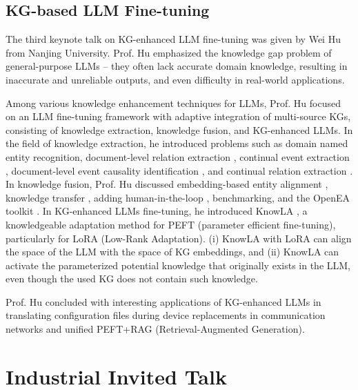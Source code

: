 \documentclass{sig-alternate-10pt}
\begin{document}
\vspace{-1mm}
\subsection{KG-based LLM Fine-tuning} 
\label{sec:keynote3}

\medskip
\medskip

The third keynote talk on KG-enhanced LLM
fine-tuning was given by Wei Hu from
Nanjing University. Prof. Hu emphasized the knowledge gap problem of general-purpose LLMs -- they often lack accurate domain knowledge, resulting in
inaccurate and unreliable outputs, and even difficulty in real-world applications.

Among various knowledge enhancement techniques for LLMs, Prof. Hu focused on an LLM fine-tuning framework with adaptive integration of multi-source KGs, consisting of knowledge extraction, knowledge fusion, and KG-enhanced LLMs. In the field of knowledge extraction, he introduced problems such as domain named
entity recognition, document-level relation extraction \cite{WangWSH22}, continual event extraction \cite{WangW023}, document-level event causality identification \cite{LJZGH23}, and continual relation extraction \cite{WangWH23}. In knowledge fusion, Prof. Hu discussed embedding-based entity alignment \cite{TianS024,SunHXCRH23,GuoZSCHC22,SunHWWQ23}, knowledge transfer \cite{JiaoLWHLBDLHHFY23,WZH24}, adding human-in-the-loop \cite{HuangSCXR023,HuangHBCQ23}, benchmarking, and the OpenEA toolkit \cite{SunZHWCAL20}. In KG-enhanced LLMs fine-tuning, he introduced KnowLA \cite{LuoSZZ024}, a knowledgeable adaptation method for
PEFT (parameter efficient fine-tuning), particularly for LoRA (Low-Rank Adaptation). 
(i) KnowLA with LoRA can align the space of the LLM with the space of KG embeddings, and (ii) KnowLA can activate the parameterized potential knowledge that originally exists in the LLM, even though the used KG does not contain such knowledge.

Prof. Hu concluded with interesting applications of KG-enhanced LLMs in translating configuration files during device replacements in communication networks and unified PEFT+RAG (Retrieval-Augmented Generation). 


\section{Industrial Invited Talk}
\label{sec:industry}

\medskip
\medskip
\end{document}

